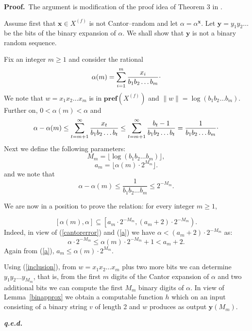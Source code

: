 \documentclass[11pt,a4paper,twoside]{article}
\def \pref#1{{\mathbf{pref}({#1})}}
\newcommand{\x}{{\mathbf x}}
\newcommand{\y}{{\mathbf y}}
\def \XF  {X^{(f)}}
\def \raisedot {\raisebox{.5ex}{.}}
\newenvironment{proof}{\textbf{Proof.\,}}{\hfill\textbf{\itshape
q.e.d.}\par}
\begin{document}
\begin{proof} 
The argument  is modification of the proof idea of Theorem 3 in
\cite{ludwig1}.

 Assume first that $\x \in\XF$ is not Cantor--random and let
$\alpha = \alpha^{\x}$. Let  $\y = y_{1}y_{2}\ldots$ be the bits of the
binary expansion of $\alpha$. We shall show that $\y$ is not a binary random
sequence.

Fix an integer $m\ge 1$ and consider the rational
\[\alpha (m) = \sum_{i=1}^{m} \frac{x_{i}}{b_{1}b_{2}\ldots
b_{m}}\raisedot\]
We note that $w=x_{1}x_{2}\ldots x_{m}$ is in $\pref{\XF}$
and $\parallel w \parallel = \log (b_{1}b_{2}\ldots b_{m})$. Further on,  $0
< \alpha(m) < \alpha$ and
\[\alpha - \alpha(m)   \le  \sum_{t=m+1}^{\infty}
\frac{x_{t}}{b_{1}b_{2}\ldots b_{t}}
  \le  \sum_{t=m+1}^{\infty} \frac{b_{t}-1}{b_{1}b_{2}\ldots b_{t}}
=  \frac{1}{b_{1}b_{2}\ldots b_{m}}\raisedot
\]
 Next we define the following parameters:
 \begin{equation}
\label{M}
M_{m} = \lfloor \log (b_{1}b_{2}\ldots b_{m})\rfloor,
\end{equation}
\begin{equation}
\label{a}
a_{m} = \lfloor \alpha(m)\cdot 2^{M_{m}}  \rfloor.
\end{equation}
and we note that
\begin{equation}
\label{cantorerror}
 \alpha - \alpha(m) \le \frac{1}{b_{1}b_{2}\ldots b_{m}} \le 2^{-M_{m}}.
 \end{equation}

We are now in a position to  prove the relation: for every integer $m\ge 1$,

\begin{equation}
\label{inclusion}
[\alpha(m), \alpha] \subseteq \left[a_{m}\cdot 2^{-M_{m}}, (a_{m}+2)\cdot
2^{-M_{m}}\right).
\end{equation}
Indeed, in view of (\ref{cantorerror})
and (\ref{a}) we have $\alpha < (a_{m}+2)\cdot 2^{-M_{m}}$ as:
\[\alpha \cdot 2^{-M_{m}} \le \alpha(m) \cdot 2^{-M_{m}} +1 < a_{m} +2. \]
Again from (\ref{a}), $ a_{m} \le \alpha(m)\cdot 2^{M_{m}}$.


Using (\ref{inclusion}),  from $w= x_1 x_2 \ldots x_m$ plus two more bits we
can determine $y_{1} y_{2} \ldots y_{M_{m}}$, that is, from the first $m$
digits of the Cantor expansion of $\alpha$ and two additional bits we can
compute the first $M_{m}$ binary digits of $\alpha$. In view of
Lemma~\ref{binapprox} we obtain
a computable function $h$ which  on  an input consisting of a binary string
$v$ of length 2
and $w$  produces as output $\y (M_{m})$.


\end{proof}
\end{document}
